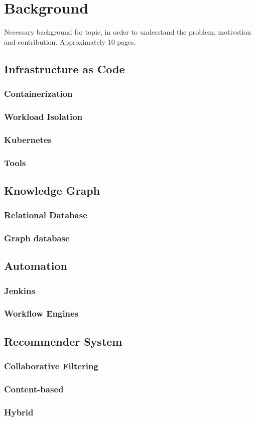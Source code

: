 \chapter{Background}
Necessary background for topic, in order to understand the problem, motivation and contribution. Approximately 10 pages.

\section{Infrastructure as Code}
\subsection{Containerization}
\subsection{Workload Isolation}
\subsection{Kubernetes}
\subsection{Tools}

\section{Knowledge Graph}
\subsection{Relational Database}
\subsection{Graph database}

\section{Automation}
\subsection{Jenkins}
\subsection{Workflow Engines}

\section{Recommender System}
\subsection{Collaborative Filtering}
\subsection{Content-based}
\subsection{Hybrid}
